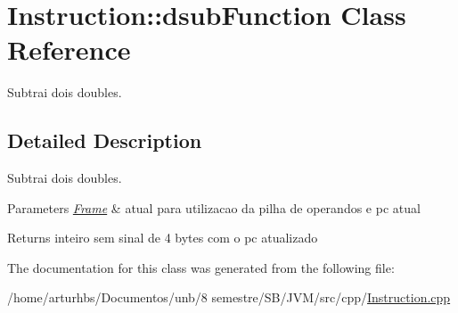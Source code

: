 \hypertarget{classInstruction_1_1dsubFunction}{}\section{Instruction\+:\+:dsub\+Function Class Reference}
\label{classInstruction_1_1dsubFunction}


Subtrai dois doubles.  




\subsection{Detailed Description}
Subtrai dois doubles. 


\begin{DoxyParams}{Parameters}
{\em \hyperlink{classFrame}{Frame}} & atual para utilizacao da pilha de operandos e pc atual \\
\hline
\end{DoxyParams}
\begin{DoxyReturn}{Returns}
inteiro sem sinal de 4 bytes com o pc atualizado 
\end{DoxyReturn}


The documentation for this class was generated from the following file\+:\begin{DoxyCompactItemize}
\item 
/home/arturhbs/\+Documentos/unb/8 semestre/\+S\+B/\+J\+V\+M/src/cpp/\hyperlink{Instruction_8cpp}{Instruction.\+cpp}\end{DoxyCompactItemize}

